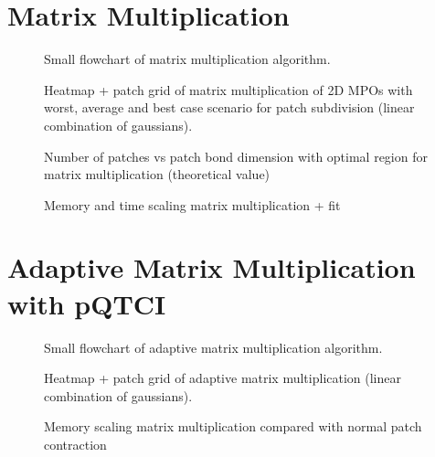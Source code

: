 \section{Matrix Multiplication}

\begin{figure}[h!]
    \caption{Small flowchart of matrix multiplication algorithm. }
\end{figure}

\begin{figure}[h!]
    \caption{Heatmap + patch grid of matrix multiplication of 2D MPOs with worst, average and best case scenario for patch subdivision (linear combination of gaussians). }
\end{figure}

\begin{figure}[h!]
    \caption{Number of patches vs patch bond dimension with optimal region for matrix multiplication (theoretical value) }
\end{figure}

\begin{figure}[h!]
    \caption{Memory and time scaling matrix multiplication + fit  }
\end{figure}


\section{Adaptive Matrix Multiplication with pQTCI}

\begin{figure}[h!]
    \caption{Small flowchart of adaptive matrix multiplication algorithm.}
\end{figure}

\begin{figure}[h!]
    \caption{Heatmap + patch grid of adaptive matrix multiplication (linear combination of gaussians). }
\end{figure}

\begin{figure}[h!]
    \caption{Memory scaling matrix multiplication compared with normal patch contraction }
\end{figure}


